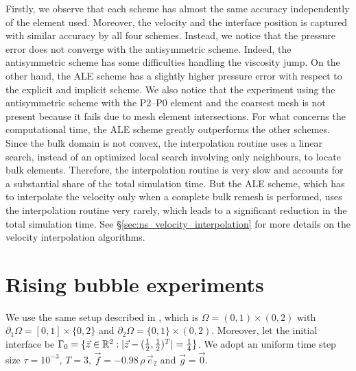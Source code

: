 Firstly, we observe that each scheme has almost the same accuracy independently
of the element used. Moreover, the velocity and the interface position is
captured with similar accuracy by all four schemes. Instead, we notice that the
pressure error does not converge with the antisymmetric scheme. Indeed, the
antisymmetric scheme has some difficulties handling the viscosity jump. On the
other hand, the ALE scheme has a slightly higher pressure error with respect
to the explicit and implicit scheme. We also notice that the experiment using
the antisymmetric scheme with the P2--P0 element and the coarsest mesh is not
present because it fails due to mesh element intersections. For what concerns
the computational time, the ALE scheme greatly outperforms the other schemes.
Since the bulk domain is not convex, the interpolation routine uses a linear
search, instead of an optimized local search involving only neighbours, to
locate bulk elements. Therefore, the interpolation routine is very slow and
accounts for a substantial share of the total simulation time. But the ALE
scheme, which has to interpolate the velocity only when a complete bulk remesh
is performed, uses the interpolation routine very rarely, which leads to a
significant reduction in the total simulation time. See
\S\ref{sec:ns_velocity_interpolation} for more details on the velocity
interpolation algorithms.

\section{Rising bubble experiments}\label{sec:2d_rising_bubble_results}
We use the same  setup described in \cite[Figure~2]{HysingTKPBGT09}, which is
${\Omega = (0,1) \times (0,2)}$ with $\partial_1\Omega = [0,1] \times \{0,2\}$
and $\partial_2\Omega = \{0,1\} \times (0,2)$. Moreover, let the initial
interface be ${\Gamma_0 = \{\vec z \in \mathbb R^2 : |\vec z - (\frac{1}{2},
\frac{1}{2})^T| = \frac{1}{4}\}}$.  We adopt an uniform time step size
$\tau=10^{-3}$, $T=3$, $\vec f = -0.98\,\rho\,\vec e_2$ and $\vec g=\vec 0$.

